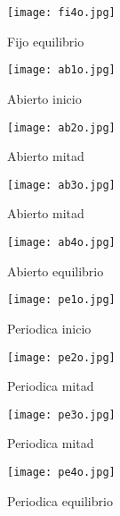 \documentclass{article}
\begin{document}
\begin{figure}[h!]
\centering
\texttt{[image: fi4o.jpg]}
\caption{Fijo equilibrio}
\label{fig:universe}
\end{figure}


\begin{figure}[h!]
\centering
\texttt{[image: ab1o.jpg]}
\caption{Abierto inicio }
\label{fig:universe}
\end{figure}

\begin{figure}[h!]
\centering
\texttt{[image: ab2o.jpg]}
\caption{Abierto mitad }
\label{fig:universe}
\end{figure}

\begin{figure}[h!]
\centering
\texttt{[image: ab3o.jpg]}
\caption{Abierto mitad}
\label{fig:universe}
\end{figure}

\begin{figure}[h!]
\centering
\texttt{[image: ab4o.jpg]}
\caption{Abierto equilibrio}
\label{fig:universe}
\end{figure}

\begin{figure}[h!]
\centering
\texttt{[image: pe1o.jpg]}
\caption{Periodica inicio }
\label{fig:universe}
\end{figure}

\begin{figure}[h!]
\centering
\texttt{[image: pe2o.jpg]}
\caption{Periodica mitad }
\label{fig:universe}
\end{figure}

\begin{figure}[h!]
\centering
\texttt{[image: pe3o.jpg]}
\caption{Periodica mitad}
\label{fig:universe}
\end{figure}

\begin{figure}[h!]
\centering
\texttt{[image: pe4o.jpg]}
\caption{Periodica equilibrio}
\label{fig:universe}
\end{figure}
\end{document}
